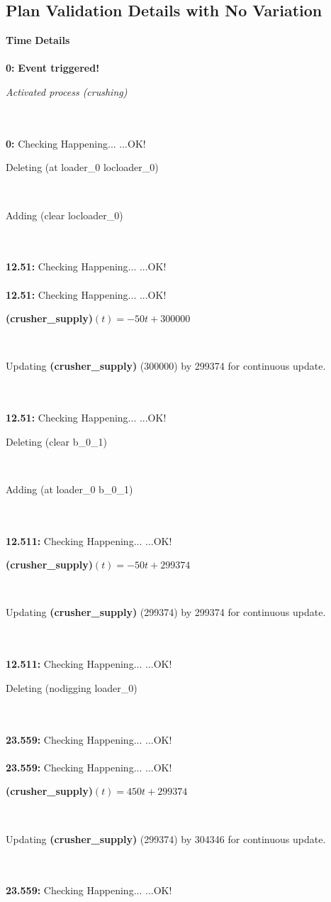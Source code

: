 \documentclass[a4paper,12pt]{article}
\newcommand{\headingtimedetails}{{\bf Time} \qquad \= {\bf Details}\\[0.8ex]}
\newcommand{\atime}[1]{{\bf #1:}}
\newcommand{\action}[1]{{\sf #1}}
\newcommand{\exprn}[1]{{\sf #1}}
\newcommand{\fexprn}[1]{{\small {\bf #1}}}
\newcommand{\checkhappening}{Checking Happening... }
\newcommand{\eventtriggered}{{\bf Event triggered!}}
\newcommand{\listrow}[1]{\begin{minipage}[t]{11.5cm} #1 \end{minipage}}
\newcommand{\happeningOK}{...OK!}
\newcommand{\aprocessactivated}[1]{\listrow{{\it Activated process #1} }}
\newcommand{\assignmentcts}[3]{\listrow{Updating \fexprn{#1} (#2) by #3 for continuous update.}}
\newcommand{\function}[2]{\listrow{\fexprn{#1}$(t) = #2$}}
\newcommand{\adding}[1]{\listrow{Adding \exprn{#1} }}
\newcommand{\deleting}[1]{\listrow{Deleting \exprn{#1} }}
\begin{document}
\subsection{Plan Validation Details with No Variation}
\begin{tabbing}
\headingtimedetails 
\\
 \atime{0} \> \eventtriggered \\
\> \aprocessactivated{\action{(crushing)}}\\
\\
\atime{0} \> \checkhappening\happeningOK\\
 \> \deleting{(at loader\_0 locloader\_0)}\\
 \> \adding{(clear locloader\_0)}\\
\\
\atime{12.51} \> \checkhappening\happeningOK\\
\\
\atime{12.51} \> \checkhappening\happeningOK\\
 \> \function{(crusher\_supply)}{ - 50t + 300000}\\
 \> \assignmentcts{(crusher\_supply)}{300000}{299374}\\
\\
\atime{12.51} \> \checkhappening\happeningOK\\
 \> \deleting{(clear b\_0\_1)}\\
 \> \adding{(at loader\_0 b\_0\_1)}\\
\\
\atime{12.511} \> \checkhappening\happeningOK\\
 \> \function{(crusher\_supply)}{ - 50t + 299374}\\
 \> \assignmentcts{(crusher\_supply)}{299374}{299374}\\
\\
\atime{12.511} \> \checkhappening\happeningOK\\
 \> \deleting{(nodigging loader\_0)}\\
\\
\atime{23.559} \> \checkhappening\happeningOK\\
\\
\atime{23.559} \> \checkhappening\happeningOK\\
 \> \function{(crusher\_supply)}{450t + 299374}\\
 \> \assignmentcts{(crusher\_supply)}{299374}{304346}\\
\\
\atime{23.559} \> \checkhappening\happeningOK\\

\end{tabbing}
\end{document}
